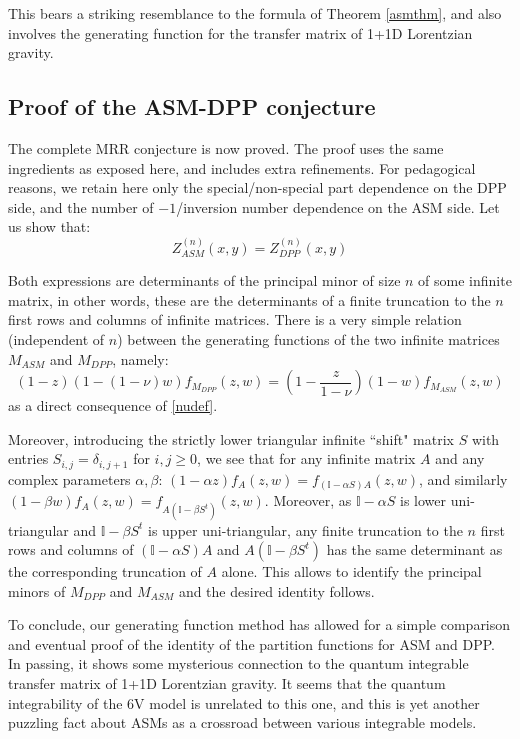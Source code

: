 \documentclass[12pt]{amsart}
\numberwithin{equation}{section}
\begin{document}
This bears a striking resemblance to the formula of Theorem \ref{asmthm}, and also involves the generating function for the transfer
matrix of 1+1D Lorentzian gravity.

\subsection{Proof of the ASM-DPP conjecture}

The complete MRR conjecture is now proved\cite{BDZJ1}. The proof uses the same ingredients as exposed here,
and includes extra refinements. For pedagogical reasons, we retain here only the special/non-special part dependence
on the DPP side, and the number of $-1$/inversion number dependence on the ASM side. Let us show that:
\begin{equation}\label{ident}
Z_{ASM}^{(n)}(x,y)= Z_{DPP}^{(n)}(x,y) \end{equation}

Both expressions are determinants of the principal minor of size $n$ of some infinite matrix, in other words, these are
the determinants of a finite truncation to the $n$ first rows and columns of infinite matrices. 
There is a very simple relation
(independent of $n$)
between the generating functions of the two infinite matrices $M_{ASM}$ and $M_{DPP}$, namely:
$$(1-z)(1-(1-\nu)w) f_{M_{DPP}}(z,w)=(1-\frac{z}{1-\nu})(1-w)f_{M_{ASM}} (z,w) $$
as a direct consequence of \eqref{nudef}.

Moreover, introducing the strictly lower triangular infinite ``shift" matrix $S$ with entries $S_{i,j}=\delta_{i,j+1}$
for $i,j\geq 0$, we see that for any infinite matrix $A$ and any complex parameters $\alpha,\beta$: 
$(1-\alpha z)f_A(z,w)=f_{({\mathbb I}-\alpha S)A}(z,w)$,
and similarly $(1-\beta w)f_A(z,w)=f_{A({\mathbb I}-\beta S^t)}(z,w)$.
Moreover, as ${\mathbb I}-\alpha S$ is lower uni-triangular and ${\mathbb I}-\beta S^t$ is upper uni-triangular,
any finite truncation to the $n$ first rows and columns of $({\mathbb I}-\alpha S)A$ and 
$A({\mathbb I}-\beta S^t)$ has the same determinant as the corresponding truncation of $A$ alone.
This allows to identify the principal minors of $M_{DPP}$ and $M_{ASM}$ and the desired identity follows.

To conclude, our generating function method has allowed for a simple comparison and eventual proof of the
identity of the partition functions for ASM and DPP. In passing, it shows some mysterious connection to
the quantum integrable transfer matrix of 1+1D Lorentzian gravity.  It seems that the quantum integrability 
of the 6V model is unrelated to this one, and this is yet another puzzling fact about ASMs as a crossroad between
various integrable models.
\end{document}
